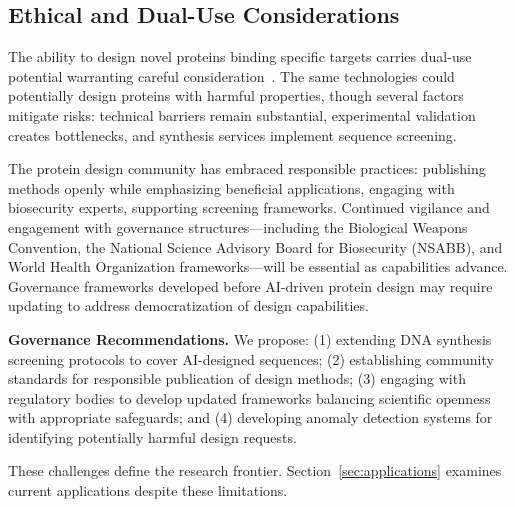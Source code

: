 \subsection{Ethical and Dual-Use Considerations}

The ability to design novel proteins binding specific targets carries dual-use potential warranting careful consideration~\cite{nrc2004biotechnology}. The same technologies could potentially design proteins with harmful properties, though several factors mitigate risks: technical barriers remain substantial, experimental validation creates bottlenecks, and synthesis services implement sequence screening.

The protein design community has embraced responsible practices: publishing methods openly while emphasizing beneficial applications, engaging with biosecurity experts, supporting screening frameworks. Continued vigilance and engagement with governance structures---including the Biological Weapons Convention, the National Science Advisory Board for Biosecurity (NSABB), and World Health Organization frameworks---will be essential as capabilities advance. Governance frameworks developed before AI-driven protein design may require updating to address democratization of design capabilities.

\textbf{Governance Recommendations.} We propose: (1) extending DNA synthesis screening protocols to cover AI-designed sequences; (2) establishing community standards for responsible publication of design methods; (3) engaging with regulatory bodies to develop updated frameworks balancing scientific openness with appropriate safeguards; and (4) developing anomaly detection systems for identifying potentially harmful design requests.

\vspace{0.5em}
\noindent
These challenges define the research frontier. Section~\ref{sec:applications} examines current applications despite these limitations.
